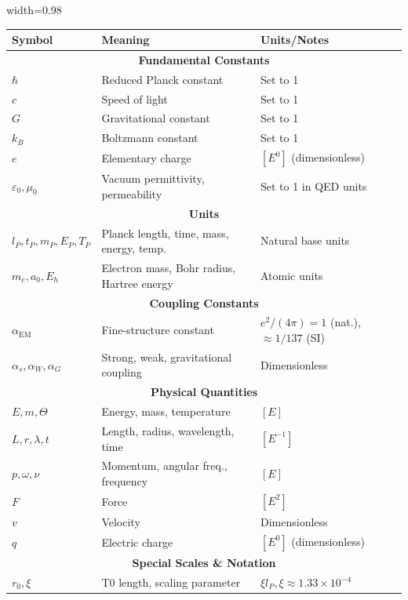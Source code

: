 	{\small
		\begin{table}[htbp]
			\centering
			\begin{adjustbox}{width=0.98\textwidth}
				\begin{tabular}{lll}
					\toprule
					\textbf{Symbol} & \textbf{Meaning} & \textbf{Units/Notes} \\
					\midrule
					\multicolumn{3}{c}{\textbf{Fundamental Constants}} \\
					$\hbar$ & Reduced Planck constant & Set to 1 \\
					$c$ & Speed of light & Set to 1 \\
					$G$ & Gravitational constant & Set to 1 \\
					$k_B$ & Boltzmann constant & Set to 1 \\
					$e$ & Elementary charge & $[E^0]$ (dimensionless) \\
					$\varepsilon_0, \mu_0$ & Vacuum permittivity, permeability & Set to 1 in QED units \\
					\midrule
					\multicolumn{3}{c}{\textbf{Units}} \\
					$l_P, t_P, m_P, E_P, T_P$ & Planck length, time, mass, energy, temp. & Natural base units \\
					$m_e, a_0, E_h$ & Electron mass, Bohr radius, Hartree energy & Atomic units \\
					\midrule
					\multicolumn{3}{c}{\textbf{Coupling Constants}} \\
					$\alpha_{\text{EM}}$ & Fine-structure constant & $e^2/(4\pi) = 1$ (nat.), $\approx 1/137$ (SI) \\
					$\alpha_s, \alpha_W, \alpha_G$ & Strong, weak, gravitational coupling & Dimensionless \\
					\midrule
					\multicolumn{3}{c}{\textbf{Physical Quantities}} \\
					$E, m, \Theta$ & Energy, mass, temperature & $[E]$ \\
					$L, r, \lambda, t$ & Length, radius, wavelength, time & $[E^{-1}]$ \\
					$p, \omega, \nu$ & Momentum, angular freq., frequency & $[E]$ \\
					$F$ & Force & $[E^2]$ \\
					$v$ & Velocity & Dimensionless \\
					$q$ & Electric charge & $[E^0]$ (dimensionless) \\
					\midrule
					\multicolumn{3}{c}{\textbf{Special Scales \& Notation}} \\
					$r_0, \xi$ & T0 length, scaling parameter & $\xi l_P, \xi \approx 1.33 \times 10^{-4}$ \\

\end{tabular}
\end{adjustbox}
\end{table}}
